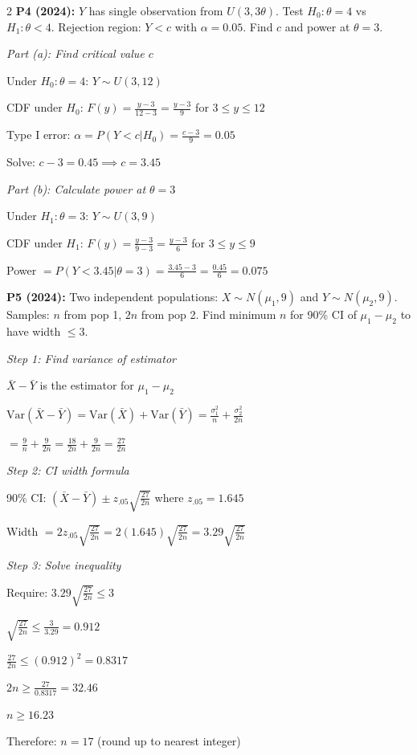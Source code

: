 \documentclass[10pt,letterpaper]{article}
\newcommand{\Var}{\text{Var}}
\begin{document}
\begin{multicols}{2}
\textbf{P4 (2024):} $Y$ has single observation from $U(3, 3\theta)$. Test $H_0: \theta=4$ vs $H_1: \theta<4$. Rejection region: $Y < c$ with $\alpha=0.05$. Find $c$ and power at $\theta=3$.

\textit{Part (a): Find critical value $c$}

Under $H_0: \theta=4$: $Y \sim U(3, 12)$

CDF under $H_0$: $F(y) = \frac{y-3}{12-3} = \frac{y-3}{9}$ for $3 \le y \le 12$

Type I error: $\alpha = P(Y < c | H_0) = \frac{c-3}{9} = 0.05$

Solve: $c - 3 = 0.45 \implies \boxed{c = 3.45}$

\textit{Part (b): Calculate power at $\theta=3$}

Under $H_1: \theta=3$: $Y \sim U(3, 9)$

CDF under $H_1$: $F(y) = \frac{y-3}{9-3} = \frac{y-3}{6}$ for $3 \le y \le 9$

Power $= P(Y < 3.45|\theta=3) = \frac{3.45-3}{6} = \frac{0.45}{6} = \boxed{0.075}$

\textbf{P5 (2024):} Two independent populations: $X \sim N(\mu_1, 9)$ and $Y \sim N(\mu_2, 9)$. Samples: $n$ from pop 1, $2n$ from pop 2. Find minimum $n$ for 90\% CI of $\mu_1-\mu_2$ to have width $\le 3$.

\textit{Step 1: Find variance of estimator}

$\bar{X} - \bar{Y}$ is the estimator for $\mu_1 - \mu_2$

$\Var(\bar{X}-\bar{Y}) = \Var(\bar{X}) + \Var(\bar{Y}) = \frac{\sigma_1^2}{n} + \frac{\sigma_2^2}{2n}$

$= \frac{9}{n} + \frac{9}{2n} = \frac{18}{2n} + \frac{9}{2n} = \frac{27}{2n}$

\textit{Step 2: CI width formula}

90\% CI: $(\bar{X}-\bar{Y}) \pm z_{.05}\sqrt{\frac{27}{2n}}$ where $z_{.05} = 1.645$

Width $= 2z_{.05}\sqrt{\frac{27}{2n}} = 2(1.645)\sqrt{\frac{27}{2n}} = 3.29\sqrt{\frac{27}{2n}}$

\textit{Step 3: Solve inequality}

Require: $3.29\sqrt{\frac{27}{2n}} \le 3$

$\sqrt{\frac{27}{2n}} \le \frac{3}{3.29} = 0.912$

$\frac{27}{2n} \le (0.912)^2 = 0.8317$

$2n \ge \frac{27}{0.8317} = 32.46$

$n \ge 16.23$

Therefore: $\boxed{n = 17}$ (round up to nearest integer)

\end{multicols}
\end{document}
